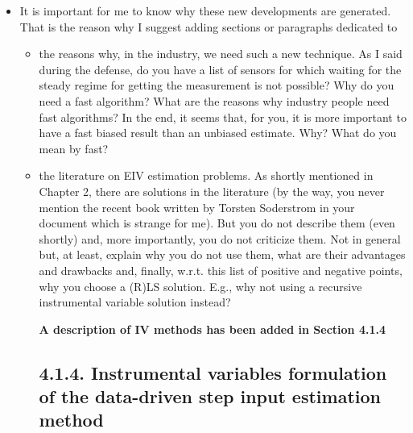 \documentclass[11pt]{article}
\begin{document}
\begin{itemize}
	\item It is important for me to know why these new developments are generated. That is the reason why I suggest adding sections or paragraphs dedicated to
    \begin{itemize}
        \item the reasons why, in the industry, we need such a new technique. As I said during the defense, do you have a list of sensors for which waiting for the steady regime for getting the measurement is not possible? Why do you need a fast algorithm? What are the reasons why industry people need fast algorithms? In the end, it seems that, for you, it is more important to have a fast biased result than an unbiased estimate. Why? What do you mean by fast?
        \item  the literature on EIV estimation problems. As shortly mentioned in Chapter 2, there are solutions in the literature (by the way, you never mention the recent book written by Torsten Soderstrom in your document which is strange for me). But you do not describe them (even shortly) and, more importantly, you do not criticize them. Not in general but, at least, explain why you do not use them, what are their advantages and drawbacks and, finally, w.r.t. this list of positive and negative points, why you choose a (R)LS solution. E.g., why not using a recursive instrumental variable solution instead?
        
        {\bfseries A description of IV methods has been added in Section 4.1.4}
        
        \color{blue}
    \subsection*{4.1.4. Instrumental variables formulation of the data-driven step input estimation method}


\end{itemize}
\end{itemize}
\end{document}
